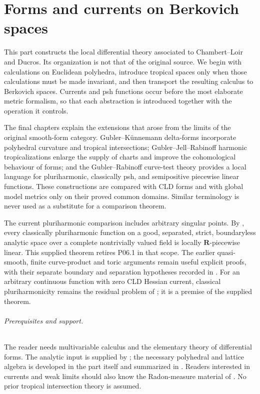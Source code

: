 \part{Forms and currents on Berkovich spaces}
\label{part:cld}

This part constructs the local differential theory associated to
Chambert--Loir and Ducros.  Its organization is not that of the original
source.  We begin with calculations on Euclidean polyhedra, introduce
tropical spaces only when those calculations must be made invariant, and
then transport the resulting calculus to Berkovich spaces.  Currents and psh
functions occur before the most elaborate metric formalism, so that each
abstraction is introduced together with the operation it controls.

The final chapters explain the extensions that arose from the limits of the
original smooth-form category.  Gubler--K\"unnemann delta-forms incorporate
polyhedral curvature and tropical intersections; Gubler--Jell--Rabinoff
harmonic tropicalizations enlarge the supply of charts and improve the
cohomological behaviour of forms; and the Gubler--Rabinoff curve-test theory
provides a local language for pluriharmonic, classically psh, and semipositive
piecewise linear functions.  These constructions are compared with CLD forms
and with global model metrics only on their proved common domains.  Similar
terminology is never used as a substitute for a comparison theorem.

The current pluriharmonic comparison includes arbitrary singular points.
By , every classically
pluriharmonic function on a good, separated, strict, boundaryless analytic
space over a complete nontrivially valued field is locally
\(\mathbf R\)-piecewise linear. This supplied theorem retires P06.1
in that scope. The earlier quasi-smooth, finite curve-product and toric
arguments remain useful explicit proofs, with their separate boundary
and separation hypotheses recorded in .
For an arbitrary continuous function with zero CLD Hessian current,
classical pluriharmonicity remains the residual problem of
; it is a premise of the supplied
theorem.

\paragraph{Prerequisites and support.}
\label{front:part2-prerequisites-and-support}
The reader needs multivariable calculus and the elementary theory of
differential forms.  The analytic input is supplied by
; the necessary polyhedral
and lattice algebra is developed in the part itself and summarized in
.  Readers interested in currents and weak limits
should also know the Radon-measure material of
.  No prior tropical intersection theory is
assumed.

